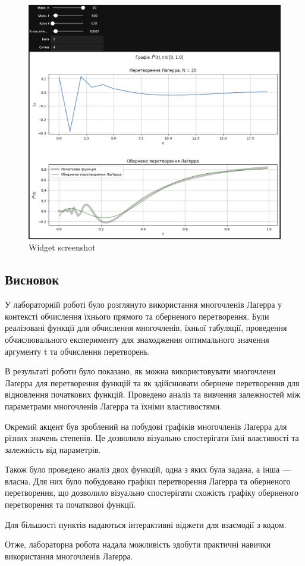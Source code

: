 \documentclass[11pt]{article}
\begin{document}
    \begin{figure}
\centering
\includegraphics{screenshots/8.png}
\caption{Widget screenshot}
\end{figure}
\newpage

    \subsection*{Висновок}\label{ux432ux438ux441ux43dux43eux432ux43eux43a}

У лабораторній роботі було розглянуто використання многочленів Лаґерра у
контексті обчислення їхнього прямого та оберненого перетворення. Були
реалізовані функції для обчислення многочленів, їхньої табуляції,
проведення обчислювального експерименту для знаходження оптимального
значення аргументу t та обчислення перетворень.

В результаті роботи було показано, як можна використовувати многочлени
Лаґерра для перетворення функцій та як здійснювати обернене перетворення
для відновлення початкових функцій. Проведено аналіз та вивчення
залежностей між параметрами многочленів Лаґерра та їхніми властивостями.

Окремий акцент був зроблений на побудові графіків многочленів Лаґерра
для різних значень степенів. Це дозволило візуально спостерігати їхні
властивості та залежність від параметрів.

Також було проведено аналіз двох функцій, одна з яких була задана, а
інша --- власна. Для них було побудовано графіки перетворення Лаґерра та
оберненого перетворення, що дозволило візуально спостерігати схожість
графіку оберненого перетворення та початкової функції.

Для більшості пунктів надаються інтерактивні віджети для взаємодії з кодом.

Отже, лабораторна робота надала можливість здобути практичні навички
використання многочленів Лаґерра.


    
    
    
\end{document}
